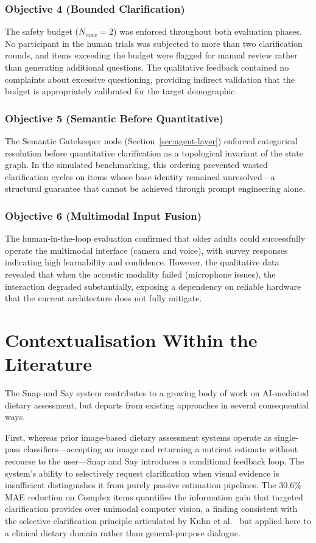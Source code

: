 \subsubsection{Objective 4 (Bounded Clarification)}
The safety budget ($N_{max}=2$) was enforced throughout both evaluation phases. No participant in the human trials was subjected to more than two clarification rounds, and items exceeding the budget were flagged for manual review rather than generating additional questions. The qualitative feedback contained no complaints about excessive questioning, providing indirect validation that the budget is appropriately calibrated for the target demographic.

\subsubsection{Objective 5 (Semantic Before Quantitative)}
The Semantic Gatekeeper node (Section~\ref{sec:agent-layer}) enforced categorical resolution before quantitative clarification as a topological invariant of the state graph. In the simulated benchmarking, this ordering prevented wasted clarification cycles on items whose base identity remained unresolved---a structural guarantee that cannot be achieved through prompt engineering alone.

\subsubsection{Objective 6 (Multimodal Input Fusion)}
The human-in-the-loop evaluation confirmed that older adults could successfully operate the multimodal interface (camera and voice), with survey responses indicating high learnability and confidence. However, the qualitative data revealed that when the acoustic modality failed (microphone issues), the interaction degraded substantially, exposing a dependency on reliable hardware that the current architecture does not fully mitigate.

\section{Contextualisation Within the Literature}

The Snap and Say system contributes to a growing body of work on AI-mediated dietary assessment, but departs from existing approaches in several consequential ways.

First, whereas prior image-based dietary assessment systems \citep{loImageBasedFoodClassification2020,zhangImagebasedMethodsDietary2024} operate as single-pass classifiers---accepting an image and returning a nutrient estimate without recourse to the user---Snap and Say introduces a conditional feedback loop. The system's ability to selectively request clarification when visual evidence is insufficient distinguishes it from purely passive estimation pipelines. The $30.6\%$ MAE reduction on Complex items quantifies the information gain that targeted clarification provides over unimodal computer vision, a finding consistent with the selective clarification principle articulated by Kuhn et al.\ \citep{kuhnCLAMSelectiveClarification2023} but applied here to a clinical dietary domain rather than general-purpose dialogue.

